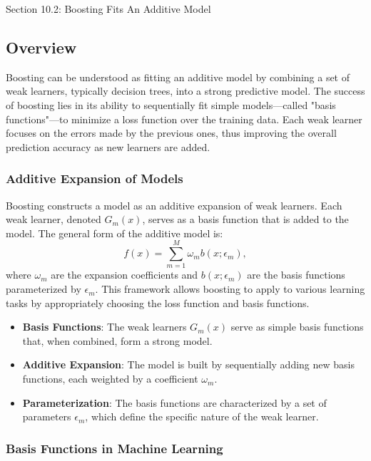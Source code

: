 \begin{notes}{Section 10.2: Boosting Fits An Additive Model}
    \subsection*{Overview}

    Boosting can be understood as fitting an additive model by combining a set of weak learners, typically decision trees, into a strong predictive model. The success of boosting lies in its ability 
    to sequentially fit simple models—called "basis functions"—to minimize a loss function over the training data. Each weak learner focuses on the errors made by the previous ones, thus improving 
    the overall prediction accuracy as new learners are added.
    
    \subsubsection*{Additive Expansion of Models}
    
    Boosting constructs a model as an additive expansion of weak learners. Each weak learner, denoted $G_m(x)$, serves as a basis function that is added to the model. The general form of the additive model is:
    \[
    f(x) = \sum_{m=1}^{M} \omega_m b(x; \epsilon_m),
    \]
    where $\omega_m$ are the expansion coefficients and $b(x; \epsilon_m)$ are the basis functions parameterized by $\epsilon_m$. This framework allows boosting to apply to various 
    learning tasks by appropriately choosing the loss function and basis functions.
    
    \begin{highlight}
        \begin{itemize}
            \item \textbf{Basis Functions}: The weak learners $G_m(x)$ serve as simple basis functions that, when combined, form a strong model.
            \item \textbf{Additive Expansion}: The model is built by sequentially adding new basis functions, each weighted by a coefficient $\omega_m$.
            \item \textbf{Parameterization}: The basis functions are characterized by a set of parameters $\epsilon_m$, which define the specific nature of the weak learner.
        \end{itemize}
    \end{highlight}
    
    \subsubsection*{Basis Functions in Machine Learning}
    

\end{notes}
